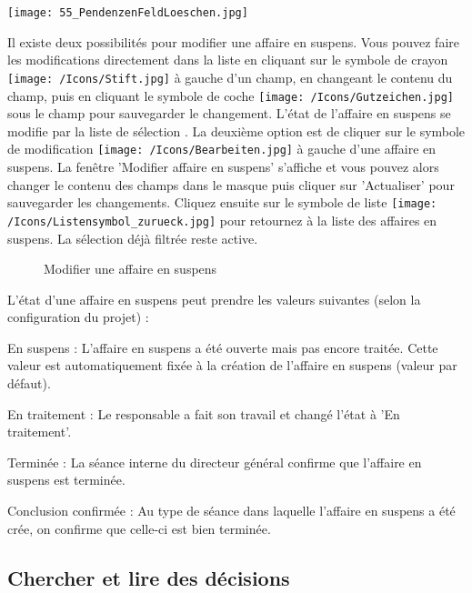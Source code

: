 \begin{center}
\texttt{[image: 55\_PendenzenFeldLoeschen.jpg]}
\end{center}

Il existe deux possibilités pour modifier une affaire en suspens. Vous pouvez faire les modifications directement dans la liste en cliquant sur le symbole de crayon \texttt{[image: /Icons/Stift.jpg]}  à gauche d'un champ, en changeant le contenu du champ, puis en cliquant le symbole de coche \texttt{[image: /Icons/Gutzeichen.jpg]}  sous le champ pour sauvegarder le changement. L'état de l'affaire en suspens se modifie par la liste de sélection . La deuxième option est de cliquer sur le symbole de modification \texttt{[image: /Icons/Bearbeiten.jpg]}  à gauche d'une affaire en suspens. La fenêtre 'Modifier affaire en suspens'  s'affiche et vous pouvez alors changer le contenu des champs dans le masque puis cliquer sur 'Actualiser' pour sauvegarder les changements. Cliquez ensuite sur le symbole de liste \texttt{[image: /Icons/Listensymbol\_zurueck.jpg]}  pour retournez à la liste des affaires en suspens. La sélection déjà filtrée reste active.


\begin{figure}[H]
\caption{Modifier une affaire en suspens}
\end{figure}

L'état d'une affaire en suspens peut prendre les valeurs suivantes (selon la configuration du projet) :

\begin{compactitem}
\item
En suspens : L'affaire en suspens a été ouverte mais pas encore traitée. Cette valeur est automatiquement fixée à la création de l'affaire en suspens (valeur par défaut).
\item
En traitement : Le responsable a fait son travail et changé l'état à 'En traitement'.
\item
Terminée : La séance interne du directeur général confirme que l'affaire en suspens est terminée.
\item
Conclusion confirmée : Au type de séance dans laquelle l'affaire en suspens a été crée, 
on confirme que celle-ci est bien terminée.
\end{compactitem}

\subsection{Chercher et lire des décisions}

